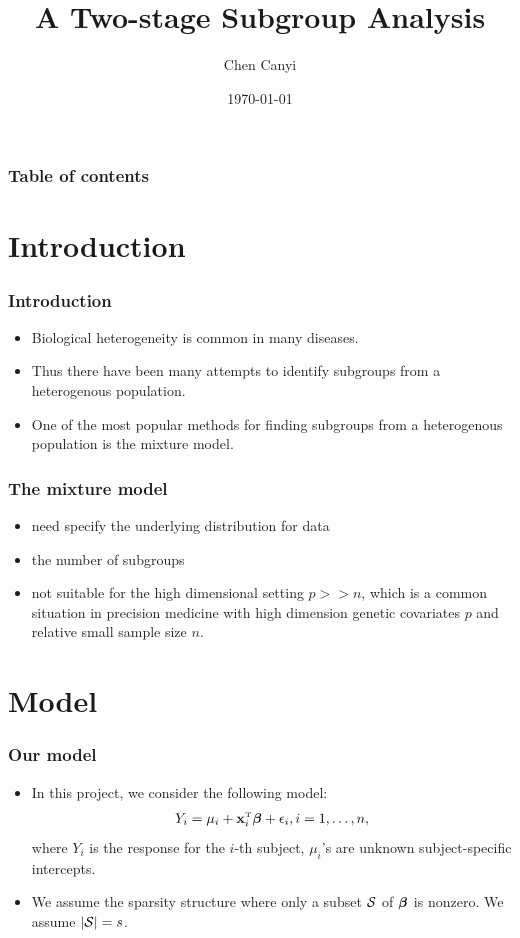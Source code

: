 \documentclass[hyperref={pdfpagelabels=false}]{beamer}
\title{A Two-stage Subgroup Analysis}
\author{Chen Canyi}
\date{\today}
\begin{document}
\begin{frame}
\titlepage
\end{frame} 


\begin{frame}
\frametitle{Table of contents}
\tableofcontents
\end{frame} 


\section{Introduction} 
\begin{frame}
	\frametitle{Introduction} 
	\begin{itemize}
		\item Biological heterogeneity is common in many diseases.
		\item Thus there have been many attempts to identify subgroups from a heterogenous population.
		\item One of the most popular methods for finding subgroups from a heterogenous population is the mixture model.
	\end{itemize}
\end{frame}

\begin{frame}
	\frametitle{The mixture model}
\begin{itemize}
	\item need specify the underlying distribution for data
	\item the number of subgroups
	\item not suitable for the high dimensional setting $p>>n$, which is a common situation in precision medicine with high dimension genetic covariates $p$ and relative small sample size $n$.
\end{itemize}
\end{frame}

\section{Model}

\begin{frame}
	\frametitle{Our model}
\begin{itemize}
	\item 	In this project, we consider the following model:
	\begin{eqnarray*}
	Y_{i} = \mu_{i} + {\bf x}_{i}^{\mbox{\tiny{T}}}\bm{\beta} + \epsilon_{i}, i = 1,\ldots,n,
	\end{eqnarray*}
	where $Y_i$ is the response for the $i$-th subject, $\mu_i$'s are unknown subject-specific intercepts.
	\item We assume the sparsity structure where only a subset $\mathcal{S}$ of $\bm{\beta}$ is nonzero. We assume $|\mathcal{S}|=s$. 
\end{itemize}
\end{frame}
\end{document}
